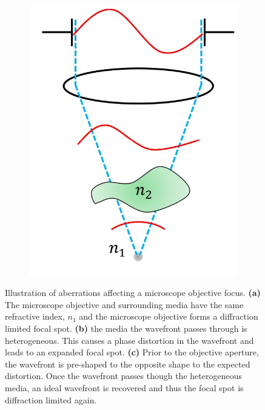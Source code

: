 \begin{figure}[h]
\begin{subfigure}[t]{0.3\textwidth}
		\includegraphics[width=\linewidth]{images/wavefront_focus_corrected.jpg}
		\caption{}
		\label{fig:wavefront_focus_corrected}
	\end{subfigure}
	\caption[Illustration of aberrations affecting a microscope objective focus.]{Illustration of aberrations affecting a microscope objective focus. \textbf{(a)} The microscope objective and surrounding media have the same refractive index, $n_{1}$ and the microscope objective forms a diffraction limited focal spot. \textbf{(b)} the media the wavefront passes through is heterogeneous. This causes a phase distortion in the wavefront and leads to an expanded focal spot. \textbf{(c)} Prior to the objective aperture, the wavefront is pre-shaped to the opposite shape to the expected distortion. Once the wavefront passes though the heterogeneous media, an ideal wavefront is recovered and thus the focal spot is diffraction limited again.}
	\label{fig:wavefront_focus}
\end{figure}

